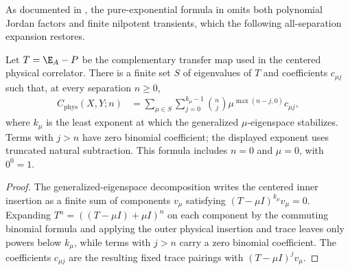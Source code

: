 As documented in \cite{gap:cpgsv21_correlator_diagonalizable_expansion},
the pure-exponential formula in \cite[Section~II.B.3]{Cirac2021Matrix}
omits both polynomial Jordan factors and finite nilpotent transients, which
the following all-separation expansion restores.

\begin{lemma}
    \label{thm:physical_correlator_binomial}
    \leanok
    Let $T=\E_A-P$ be the complementary transfer map used in the centered
    physical correlator. There is a finite set $S$ of eigenvalues of $T$
    and coefficients $c_{\mu j}$ such that, at every separation $n\ge0$,
    \begin{align}
        C_{\mathrm{phys}}(X,Y;n)
         & =\sum_{\mu\in S}\sum_{j=0}^{k_\mu-1}
        \binom nj\mu^{\max(n-j,0)}c_{\mu j},
        \label{eq:physical_correlator_binomial}
    \end{align}
    where $k_\mu$ is the least exponent at which the generalized
    $\mu$-eigenspace stabilizes. Terms with $j>n$ have zero binomial
    coefficient; the displayed exponent uses truncated natural subtraction.
    This formula includes $n=0$ and $\mu=0$, with $0^0=1$.
\end{lemma}
\begin{proof}
    \leanok
    The generalized-eigenspace decomposition writes the centered inner
    insertion as a finite sum of components $v_\mu$ satisfying
    $(T-\mu I)^{k_\mu}v_\mu=0$. Expanding $T^n=((T-\mu I)+\mu I)^n$ on each
    component by the commuting binomial formula and applying the outer
    physical insertion and trace leaves only powers below $k_\mu$, while
    terms with $j>n$ carry a zero binomial coefficient. The coefficients
    $c_{\mu j}$ are the resulting fixed trace pairings with $(T-\mu I)^jv_\mu$.
\end{proof}

